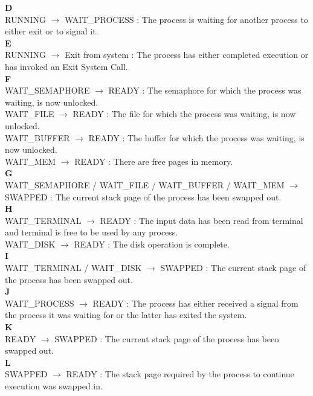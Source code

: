 \textbf{D}\\
RUNNING $\rightarrow$ WAIT\_PROCESS : The process is waiting for another process to either exit or to signal it.\\

\textbf{E}\\
RUNNING $\rightarrow$ Exit from system : The process has either completed execution or has invoked an Exit System Call.\\

\textbf{F}\\
WAIT\_SEMAPHORE $\rightarrow$ READY : The semaphore for which the process was waiting, is now unlocked.\\
WAIT\_FILE $\rightarrow$ READY : The file for which the process was waiting, is now unlocked.\\
WAIT\_BUFFER $\rightarrow$ READY : The buffer for which the process was waiting, is now unlocked.\\
WAIT\_MEM $\rightarrow$ READY : There are free pages in memory.\\

\textbf{G}\\
WAIT\_SEMAPHORE / WAIT\_FILE / WAIT\_BUFFER / WAIT\_MEM $\rightarrow$ SWAPPED : The current stack page of the process has been swapped out.\\

\textbf{H}\\
WAIT\_TERMINAL $\rightarrow$ READY : The input data has been read from terminal and terminal is free to be used by any process.\\
WAIT\_DISK $\rightarrow$ READY : The disk operation is complete.\\


\textbf{I}\\
WAIT\_TERMINAL / WAIT\_DISK $\rightarrow$ SWAPPED : The current stack page of the process has been swapped out.\\

\textbf{J}\\
WAIT\_PROCESS $\rightarrow$ READY : The process has either received a signal from the process it was waiting for or the latter has exited the system.\\

\textbf{K}\\
READY $\rightarrow$ SWAPPED : The current stack page of the process has been swapped out.\\

\textbf{L}\\
SWAPPED $\rightarrow$ READY : The stack page required by the process to continue execution was swapped in.\\

